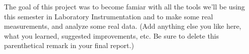 \documentclass[
  letterpaper,
  DIV=11,
  numbers=noendperiod]{scrartcl}
\begin{document}
The goal of this project was to become famiar with all the tools we'll
be using this semester in Laboratory Instrumentation and to make some
real measurements, and analyze some real data. (Add anything else you
like here, what you learned, suggested improvements, etc. Be sure to
delete this parenthetical remark in your final report.)
\end{document}
